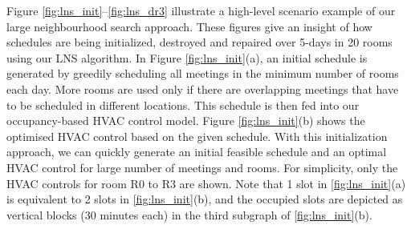 Figure \ref{fig:lns_init}--\ref{fig:lns_dr3} illustrate a high-level scenario example of our large neighbourhood search approach. These figures give an insight of how schedules are being initialized, destroyed and repaired over 5-days in 20 rooms using our LNS algorithm. In Figure \ref{fig:lns_init}(a), an initial schedule is generated by greedily scheduling all meetings in the minimum number of rooms each day. More rooms are used only if there are overlapping meetings that have to be scheduled in different locations. This schedule is then fed into our occupancy-based HVAC control model. Figure \ref{fig:lns_init}(b) shows the optimised HVAC control based on the given schedule. With this initialization approach, we can quickly generate an initial feasible schedule and an optimal HVAC control for large number of meetings and rooms. For simplicity, only the HVAC controls for room R0 to R3 are shown. Note that 1 slot in \ref{fig:lns_init}(a) is equivalent to 2 slots in \ref{fig:lns_init}(b), and the occupied slots are depicted as vertical blocks (30 minutes each) in the third subgraph of \ref{fig:lns_init}(b). 


